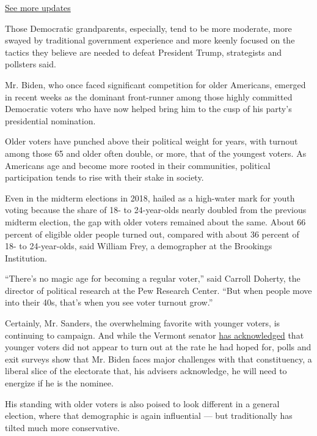 \href{https://www.nytimes.com/2020/08/03/us/elections/biden-vs-trump.html?action=click\&pgtype=Article\&state=default\&region=MAIN_CONTENT_1\&context=storylines_live_updates}{See
more updates}

Those Democratic grandparents, especially, tend to be more moderate,
more swayed by traditional government experience and more keenly focused
on the tactics they believe are needed to defeat President Trump,
strategists and pollsters said.

Mr. Biden, who once faced significant competition for older Americans,
emerged in recent weeks as the dominant front-runner among those highly
committed Democratic voters who have now helped bring him to the cusp of
his party's presidential nomination.

Older voters have punched above their political weight for years, with
turnout among those 65 and older often double, or more, that of the
youngest voters. As Americans age and become more rooted in their
communities, political participation tends to rise with their stake in
society.

Even in the midterm elections in 2018, hailed as a high-water mark for
youth voting because the share of 18- to 24-year-olds nearly doubled
from the previous midterm election, the gap with older voters remained
about the same. About 66 percent of eligible older people turned out,
compared with about 36 percent of 18- to 24-year-olds, said William
Frey, a demographer at the Brookings Institution.

``There's no magic age for becoming a regular voter,'' said Carroll
Doherty, the director of political research at the Pew Research Center.
``But when people move into their 40s, that's when you see voter turnout
grow.''

Certainly, Mr. Sanders, the overwhelming favorite with younger voters,
is continuing to campaign. And while the Vermont senator
\href{https://www.nytimes.com/2020/03/04/us/politics/bernie-sanders-young-voter-turnout.html}{has
acknowledged} that younger voters did not appear to turn out at the rate
he had hoped for, polls and exit surveys show that Mr. Biden faces major
challenges with that constituency, a liberal slice of the electorate
that, his advisers acknowledge, he will need to energize if he is the
nominee.

His standing with older voters is also poised to look different in a
general election, where that demographic is again influential --- but
traditionally has tilted much more conservative.


